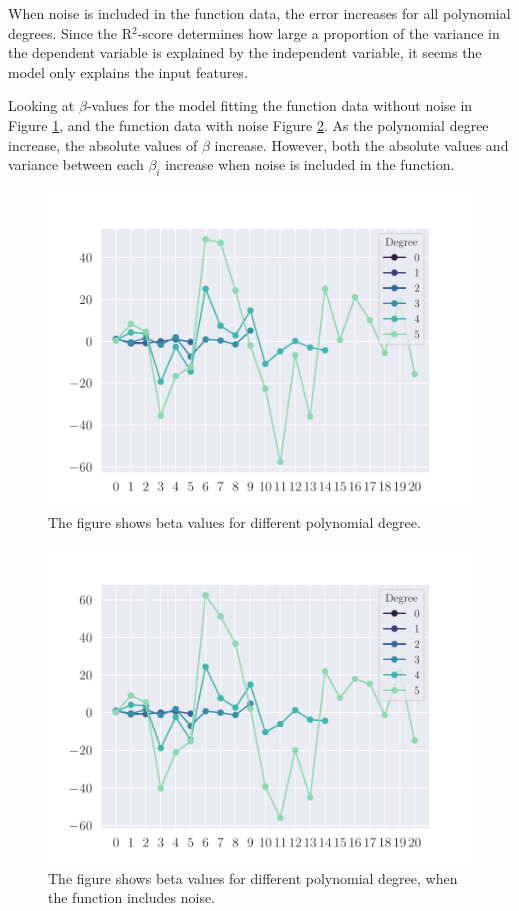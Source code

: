 When noise is included in the function data, the error increases for all polynomial degrees. Since the R$^{2}$-score determines how large a proportion of the variance in the dependent variable is explained by the independent variable, it seems the model only explains the input features.

Looking at $\beta$-values for the model fitting the function data without noise in Figure \ref{fig:ols_beta}, and the function data with noise Figure \ref{fig:ols_beta_noisy}. As the polynomial degree increase, the absolute values of $\beta$ increase. However, both the absolute values and variance between each $\beta_{i}$ increase when noise is included in the function.  
\begin{figure}
    \centering
    \includegraphics[width=0.9\linewidth]{project-1/latex/figures/ols_beta.pdf}
    \caption{The figure shows beta values for different polynomial degree.}
    \label{fig:ols_beta}
\end{figure}

\begin{figure}
    \centering
    \includegraphics[width=0.9\linewidth]{project-1/latex/figures/ols_beta_noisy.pdf}
    \caption{The figure shows beta values for different polynomial degree, when the function includes noise.}
    \label{fig:ols_beta_noisy}
\end{figure}

